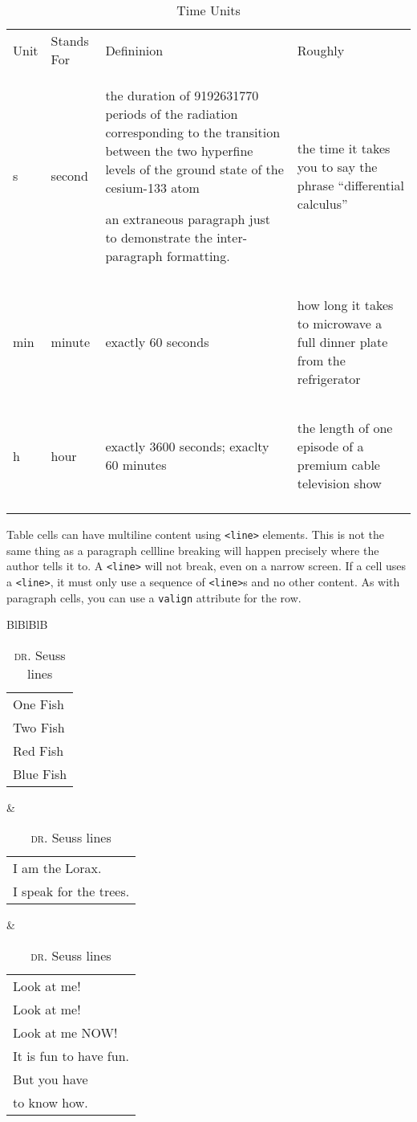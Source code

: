 \documentclass[10pt,]{article}
\makeatletter
\newcommand{\abbreviation}[1]{\textsc{\MakeLowercase{#1}}}
\theoremstyle{plain}
\theoremstyle{definition}
\theoremstyle{definition}
\theoremstyle{definition}
\theoremstyle{definition}
\theoremstyle{definition}
\theoremstyle{definition}
\numberwithin{equation}{section}
\newcommand{\hrulethin}  {\noalign{\hrule height 0.04em}}
\newcommand{\hrulemedium}{\noalign{\hrule height 0.07em}}
\newcommand{\hrulethick} {\noalign{\hrule height 0.11em}}
\newcommand{\tablecelllines}[3]%
{\begin{tabular}[#2]{@{}#1@{}}#3\end{tabular}}
\makeatother
\begin{document}
\begin{table}
\centering
\begin{tabular}{llll}\hrulethick
Unit&Stands For&Defininion&Roughly\tabularnewline\hrulemedium
\si{\second}&second&\multicolumn{1}{p{0.4\linewidth}}{\raggedright\setlength{\parskip}{0.5\baselineskip}%
\hypertarget{p-451}{}%
the duration of \num{9192631770} periods of the radiation corresponding to the transition between the two hyperfine levels of the ground state of the cesium-133 atom%
\par
\hypertarget{p-452}{}%
an extraneous paragraph just to demonstrate the inter-paragraph formatting.%
}&\multicolumn{1}{p{0.25\linewidth}}{\raggedright%
\hypertarget{p-453}{}%
the time it takes you to say the phrase ``differential calculus''%
}\tabularnewline\hrulethin
\si{\minute}&minute&\multicolumn{1}{p{0.4\linewidth}}{\raggedright%
\hypertarget{p-454}{}%
exactly \(60\) seconds%
}&\multicolumn{1}{p{0.25\linewidth}}{\raggedright%
\hypertarget{p-455}{}%
how long it takes to microwave a full dinner plate from the refrigerator%
}\tabularnewline\hrulethin
\si{\hour}&hour&\multicolumn{1}{p{0.4\linewidth}}{\raggedright%
\hypertarget{p-456}{}%
exactly \(3600\) seconds; exaclty \(60\) minutes%
}&\multicolumn{1}{p{0.25\linewidth}}{\raggedright%
\hypertarget{p-457}{}%
the length of one episode of a premium cable television show%
}\tabularnewline\hrulethick
\end{tabular}
\caption{Time Units\label{table-time-units}}
\end{table}
\hypertarget{p-458}{}%
Table cells can have multiline content using \lstinline?<line>? elements. This is not the same thing as a paragraph cell\textemdash{}line breaking will happen precisely where the author tells it to. A \lstinline?<line>? will not break, even on a narrow screen. If a cell uses a \lstinline?<line>?, it must only use a sequence of \lstinline?<line>?s and no other content. As with paragraph cells, you can use a \lstinline?valign? attribute for the row.%
\begin{table}
\centering
\begin{tabular}{BlBlBlB}\hrulemedium
\tablecelllines{l}{b}
{One Fish\\
Two Fish\\
Red Fish\\
Blue Fish}
&\tablecelllines{l}{b}
{I am the Lorax.\\
I speak for the trees.}
&\tablecelllines{l}{b}
{Look at me!\\
Look at me!\\
Look at me NOW!\\
It is fun to have fun.\\
But you have\\
to know how.}
\tabularnewline\hrulemedium
\end{tabular}
\caption{\abbreviation{Dr.} Seuss lines\label{table-multiline-cells}}
\end{table}
\end{document}
